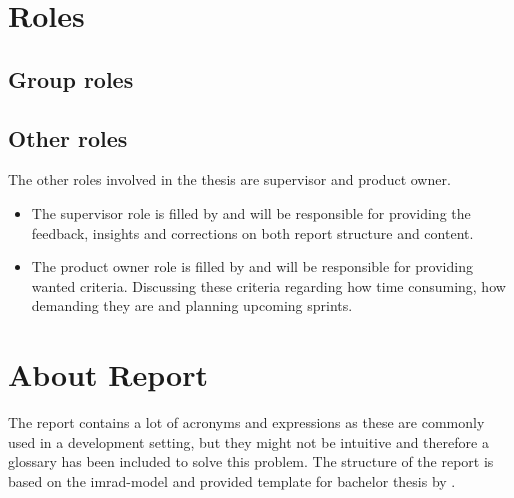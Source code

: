 \section{Roles}
\subsection{Group roles}


\subsection{Other roles}
The other roles involved in the thesis are supervisor and product owner.
\begin{itemize}
    \item The supervisor role is filled by \supervisor{} and will be responsible for providing the feedback, insights and corrections on both report structure and content.
    \item The product owner role is filled by \productowner{} and will be responsible for providing wanted criteria. Discussing these criteria regarding how time consuming, how demanding they are and planning upcoming \glspl{sprint}.
\end{itemize}


\section{About Report}
The report contains a lot of acronyms and expressions as these are commonly used in a development setting, but they might not be intuitive and therefore a glossary has been included to solve this problem. The structure of the report is based on the \gls{imrad}-model and provided template for bachelor thesis by \NTNUgjovik{}.

